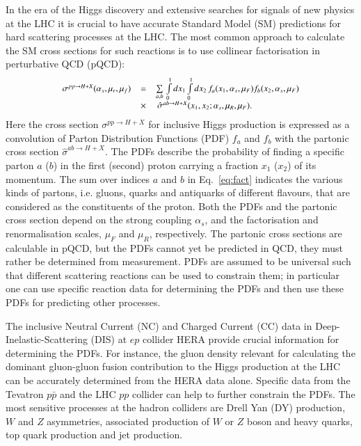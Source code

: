 In the era of the Higgs discovery and extensive searches
for signals of new physics at the LHC it is crucial
to have accurate Standard Model (SM) predictions for
hard scattering processes at the LHC.
The most common approach to calculate the SM cross sections for  
such reactions is to use collinear factorisation in perturbative QCD (pQCD):
\begin{equation}
\small
\begin{array}{lcl}
\sigma^{pp\rightarrow H + X}(\alpha_s,\mu_r,\mu_f) & = &
\sum\limits_{a,b}\,  \int\limits_{0}\limits^{1} dx_1 \int\limits_{0}\limits^{1} dx_2\, f_a(x_1,\alpha_s,\mu_F) 
 f_b(x_2,\alpha_s,\mu_F)\\ 
& \times & \, \hat{\sigma}^{ab \rightarrow H + X}(x_1,x_2;\alpha_s,\mu_R,\mu_F).
\label{eq:fact}
\end{array}
\end{equation}
Here the cross section $\sigma^{pp\rightarrow H + X}$ for inclusive
Higgs production is expressed
as a convolution of Parton Distribution Functions (PDF) $f_a$ and $f_b$
with the partonic cross section
$\hat{\sigma}^{ab \rightarrow H + X}$.
%
The PDFs describe 
the probability of finding a specific parton $a$ ($b$) in the first (second) proton carrying a fraction $x_1$ ($x_2$) of its momentum.
%
The sum over indices $a$ and $b$ in Eq.~\ref{eq:fact} indicates the various 
kinds of partons,
i.e. gluons, quarks and antiquarks of different flavours, 
that are considered
as the constituents of the proton.
%
Both the PDFs and the partonic cross section depend on the strong coupling
$\alpha_s$, and the factorisation and renormalisation scales,
$\mu_F$ and $\mu_R$, respectively.
%
The partonic cross sections are calculable in pQCD, but
the PDFs cannot yet be predicted in QCD, they must rather be 
determined from measurement. PDFs are assumed 
to be universal such that different scattering reactions can be used 
to constrain them; in particular one can use specific reaction data 
for determining the PDFs and then use these PDFs for
predicting other processes.
%

The inclusive Neutral Current (NC) and Charged Current (CC) data in Deep-Inelastic-Scattering (DIS) at $ep$ collider HERA provide crucial information for determining the PDFs.
%
For instance, the gluon density relevant
for calculating the dominant gluon-gluon fusion contribution to the Higgs production
at the LHC can be accurately determined from the HERA data alone.
%
Specific data from the Tevatron $p\bar{p}$ and the LHC $pp$ collider
can help to further constrain the PDFs.
%
The most sensitive processes at the  hadron colliders are
Drell Yan (DY) production, $W$ and $Z$ asymmetries, associated production of $W$ or $Z$ boson 
and heavy quarks, top quark production and jet production.
%

